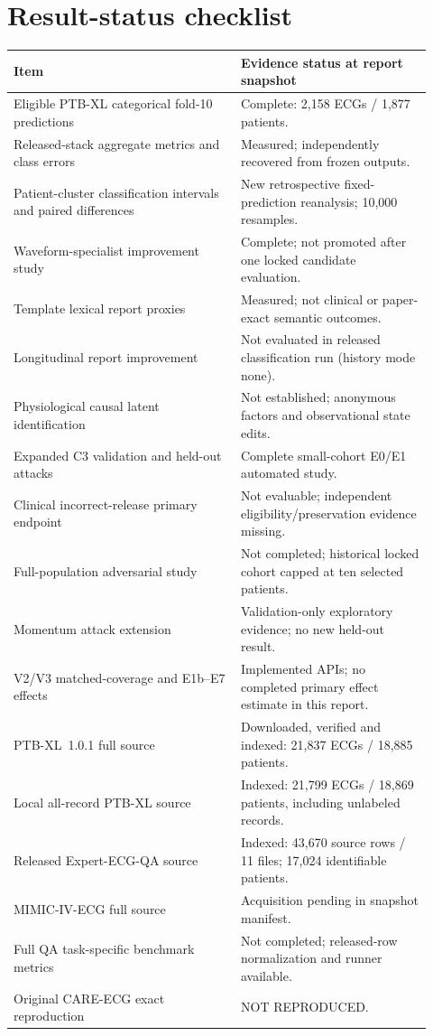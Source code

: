 \section{Result-status checklist}
\label{app:status}
\begin{longtable}{p{0.50\linewidth}p{0.42\linewidth}}
\toprule Item & Evidence status at report snapshot\\\midrule\endhead
Eligible PTB-XL categorical fold-10 predictions & Complete: 2,158 ECGs / 1,877 patients.\\
Released-stack aggregate metrics and class errors & Measured; independently recovered from frozen outputs.\\
Patient-cluster classification intervals and paired differences & New retrospective fixed-prediction reanalysis; 10,000 resamples.\\
Waveform-specialist improvement study & Complete; not promoted after one locked candidate evaluation.\\
Template lexical report proxies & Measured; not clinical or paper-exact semantic outcomes.\\
Longitudinal report improvement & Not evaluated in released classification run (history mode none).\\
Physiological causal latent identification & Not established; anonymous factors and observational state edits.\\
Expanded C3 validation and held-out attacks & Complete small-cohort E0/E1 automated study.\\
Clinical incorrect-release primary endpoint & Not evaluable; independent eligibility/preservation evidence missing.\\
Full-population adversarial study & Not completed; historical locked cohort capped at ten selected patients.\\
Momentum attack extension & Validation-only exploratory evidence; no new held-out result.\\
V2/V3 matched-coverage and E1b--E7 effects & Implemented APIs; no completed primary effect estimate in this report.\\
PTB-XL~1.0.1 full source & Downloaded, verified and indexed: 21,837 ECGs / 18,885 patients.\\
Local all-record PTB-XL source & Indexed: 21,799 ECGs / 18,869 patients, including unlabeled records.\\
Released Expert-ECG-QA source & Indexed: 43,670 source rows / 11 files; 17,024 identifiable patients.\\
MIMIC-IV-ECG full source & Acquisition pending in snapshot manifest.\\
Full QA task-specific benchmark metrics & Not completed; released-row normalization and runner available.\\
Original CARE-ECG exact reproduction & NOT REPRODUCED.\\
\bottomrule
\end{longtable}

